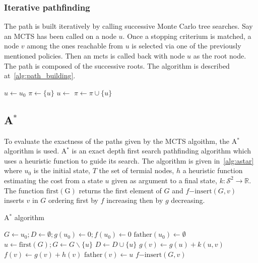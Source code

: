\documentclass[oneside,twocolumn]{article}
\DeclareMathOperator{\argmax}{argmax}
\begin{document}
\subsubsection{Iterative pathfinding}
The path is built iteratively by calling successive Monte Carlo tree searches.
Say an MCTS has been called on a node \(u\). Once a stopping criterium is
matched, a node \(v\) among the ones reachable from \(u\) is selected via one of
the previously mentioned policies. Then an mcts is called back with node \(u\)
as the root node. The path is composed of the successive roots. The algorithm is
described at~\ref{alg:path_building}.
\begin{algorithm}
  \caption{%
    Path building. The {\sc NextNode} (here max-child) function is one among
    those in~\ref{sssec:node_selection}.
  }\label{alg:path_building}
  \begin{algorithmic}
    \State{}\(u \gets u_0\)
    \State{}\(\pi \gets \{u\}\)
      \State{}
      \State{}\(u \gets\)
      \State{}\(\pi \gets \pi \cup \{u\}\)
    \EndFor{}
    \State{}\Return{$\pi$}
    \EndFunction{}
    \State{}\Return{$\argmax\{Q(v) | v \text{\,children of\,} u\}$}
    \EndFunction{}
  \end{algorithmic}
\end{algorithm}
\subsection{A\(^*\)}
To evaluate the exactness of the paths given by the MCTS algoithm, the A\(^*\)
algorithm is used. A\(^*\) is an exact depth first search pathfinding algorithm
which uses a heuristic function to guide its search. The algorithm is given
in~\ref{alg:astar} where \(u_0\) is the initial state, \(T\) the set of termial
nodes, \(h\) a heuristic function estimating the cost from a state \(u\) given
as argument to a final state, \(k \colon \mathcal{S}^2 \to \mathbb{R}\). The
function \(\mathup{first(G)}\) returns the first element of \(G\) and
\(f\mathup{-insert}(G, v)\) inserts \(v\) in \(G\) ordering first by \(f\)
increasing then by \(g\) decreasing.
\begin{algorithm}
  \caption{A\(^*\) algorithm~\cite{alliotschiex2002ia&it}}\label{alg:astar}
  \begin{algorithmic}
    \State{}\(G \gets u_0; D \gets \emptyset; g(u_0) \gets 0; f(u_0) \gets 0\)
    \State{}\(\mathup{father}(u_0) \gets \emptyset\)
    \State{}\(u \gets \mathup{first}(G); G \gets G \backslash \{u\}\)
    \State{}\(D \gets D \cup \{u\}\)
    \State{}
    \EndIf{}
    \State{}\(g(v) \gets g(u) + k(u, v)\)
    \State{}\(f(v) \gets g(v) + h(v)\)
    \State{}\(\mathup{father}(v) \gets u\)
    \State{}\(f\mathup{-insert}(G, v)\)
    \EndIf{}
    \EndFor{}
    \EndWhile{}
    \EndProcedure{}
  \end{algorithmic}
\end{algorithm}
\end{document}
